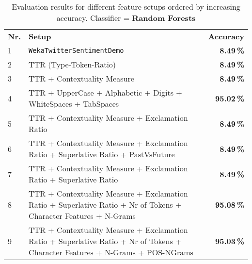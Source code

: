 \documentclass[journal, a4paper]{IEEEtran}
\begin{document}
\begin{table}[!hbt]
	\begin{center}
		\caption{Evaluation results for different feature setups ordered by increasing accuracy.
		Classifier = \textbf{Random Forests}}
		\label{tab:results-rf}
		\begin{tabularx}{80mm}{| l | X | r |}
			\hline
			\rowcolor{lightgray}
			\multicolumn{3}{| c |}{\textbf{Random Forest}} 								\\ \hline
			\rowcolor{lightgray}
			\textbf{Nr.}		&	\textbf{Setup}					& \textbf{Accuracy}		\\ \hline\hline
			1			&	\texttt{WekaTwitterSentimentDemo}	& \textbf{8.49\,\%}		\\ \hline
			2			&	TTR (Type-Token-Ratio)				& \textbf{8.49\,\%}		\\ \hline
			3			&	TTR + Contextuality Measure			& \textbf{8.49\,\%}		\\ \hline
			4			&	TTR + UpperCase + Alphabetic + Digits + WhiteSpaces + TabSpaces
																& \textbf{95.02\,\%}		\\ \hline
			5			& 	TTR + Contextuality Measure + Exclamation Ratio
																& \textbf{8.49\,\%}		\\ \hline
			6			&	TTR + Contextuality Measure + Exclamation Ratio + Superlative Ratio + PastVsFuture 
																& \textbf{8.49\,\%}		\\ \hline
			7			&	TTR + Contextuality Measure + Exclamation Ratio + Superlative Ratio 
																& \textbf{8.49\,\%}		\\ \hline
			8			&	TTR + Contextuality Measure + Exclamation Ratio + Superlative Ratio +
							Nr of Tokens + Character Features + N-Grams
																& \textbf{95.08\,\%}		\\ \hline
			9			&	TTR + Contextuality Measure + Exclamation Ratio + Superlative Ratio +
							Nr of Tokens + Character Features + N-Grams + POS-NGrams
																& \textbf{95.03\,\%}		\\ \hline
			\hline
		\end{tabularx}
	\end{center}
\end{table}
\end{document}

